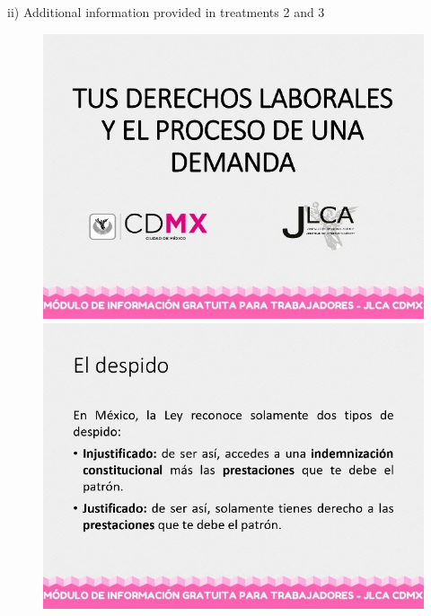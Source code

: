 ii) Additional information provided in treatments 2 and 3\\
\begin{figure}[H] 
  \centering
  \begin{minipage}[b]{0.45\textwidth}
    \includegraphics[width=\textwidth]{Figures/A2_1.jpg}
  \end{minipage}
  \begin{minipage}[b]{0.45\textwidth}
    \includegraphics[width=\textwidth]{Figures/A2_2.jpg}
  \end{minipage}
  \label{fig:A2_3_1}
\end{figure}
